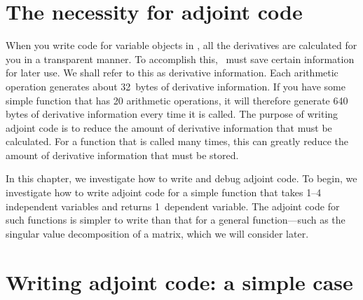 %
%

\section{The necessity for adjoint code}

When you write code for variable objects in \ADM, all the
derivatives are calculated for you in a transparent manner. 
To accomplish this, \ADM\ must save certain information for
later use. We shall refer to this as derivative information.
Each arithmetic operation generates about 32~bytes of
derivative information.  If you have some simple function that
has 20 arithmetic operations, it will therefore
generate 640 bytes of derivative information every time
it is called. The purpose of writing adjoint code is to
reduce the amount of derivative information that must
be calculated. For a function that is called many times,
this can greatly reduce the amount of derivative information that
must be stored.

In this chapter, we investigate how to write and debug
adjoint code. To begin, we investigate how to write adjoint code for a
simple function that takes 1--4 independent variables and returns 1~dependent variable. 
The adjoint code for such functions is
simpler to write than that for a general function---such as the
singular value decomposition of a matrix, which we will consider later.


\section{Writing adjoint code: a simple case}

